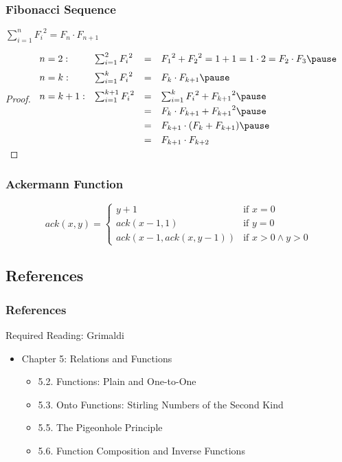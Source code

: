 \documentclass[dvipsnames]{beamer}
\begin{document}
\begin{frame}
  \frametitle{Fibonacci Sequence}

  \begin{theorem}
    $\sum_{i=1}^{n} {F_i}^2 = F_n \cdot F_{n+1}$
  \end{theorem}

  \pause
  \begin{proof}
    $\begin{array}{llcl}
      n=2:   & \sum_{i=1}^{2} {F_i}^2   & = & {F_1}^2+{F_2}^2=1+1=1 \cdot 2=F_2 \cdot F_3
      \pause
      \medskip\\
      n=k:   & \sum_{i=1}^{k} {F_i}^2   & = & F_k \cdot F_{k+1}
      \pause
      \medskip\\
      n=k+1: & \sum_{i=1}^{k+1} {F_i}^2 & = & \sum_{i=1}^{k} {F_i}^2 + {F_{k+1}}^2
      \pause
      \smallskip\\
             &                          & = & F_k \cdot F_{k+1} + {F_{k+1}}^2
      \pause
      \smallskip\\
             &                          & = & F_{k+1} \cdot (F_k + F_{k+1})
      \pause
      \smallskip\\
             &                          & = & F_{k+1} \cdot F_{k+2}
    \end{array}$
  \end{proof}
\end{frame}

\begin{frame}
  \frametitle{Ackermann Function}

  \[
    ack(x,y) =
      \begin{cases}
        y+1                 & \mbox{if } x = 0\\
        ack(x-1, 1)         & \mbox{if } y = 0\\
        ack(x-1,ack(x,y-1)) & \mbox{if } x > 0 \wedge y > 0
      \end{cases}
  \]
\end{frame}

\subsection*{References}

\begin{frame}
  \frametitle{References}

  \begin{block}{Required Reading: Grimaldi}
    \begin{itemize}
      \item Chapter 5: Relations and Functions
      \begin{itemize}
        \item 5.2. \alert{Functions: Plain and One-to-One}
        \item 5.3. \alert{Onto Functions: Stirling Numbers of the Second Kind}
        \item 5.5. \alert{The Pigeonhole Principle}
        \item 5.6. \alert{Function Composition and Inverse Functions}
      \end{itemize}
    \end{itemize}
  \end{block}
\end{frame}
\end{document}
